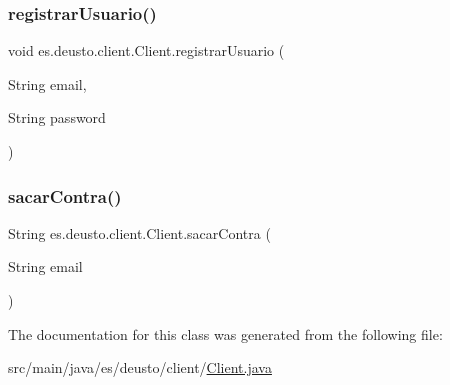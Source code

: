 \mbox{\label{classes_1_1deusto_1_1client_1_1_client_a6f2674bcf110140f6a0c146f95c7e182}} 
\subsubsection{\texorpdfstring{registrarUsuario()}{registrarUsuario()}}
{\footnotesize\ttfamily void es.\+deusto.\+client.\+Client.\+registrar\+Usuario (\begin{DoxyParamCaption}\item[{String}]{email,  }\item[{String}]{password }\end{DoxyParamCaption})}

\mbox{\label{classes_1_1deusto_1_1client_1_1_client_a6ce290f27e4f39f9493799cbc6112cc5}} 
\subsubsection{\texorpdfstring{sacarContra()}{sacarContra()}}
{\footnotesize\ttfamily String es.\+deusto.\+client.\+Client.\+sacar\+Contra (\begin{DoxyParamCaption}\item[{String}]{email }\end{DoxyParamCaption})}



The documentation for this class was generated from the following file\+:\begin{DoxyCompactItemize}
\item 
src/main/java/es/deusto/client/\mbox{\hyperlink{_client_8java}{Client.\+java}}\end{DoxyCompactItemize}
